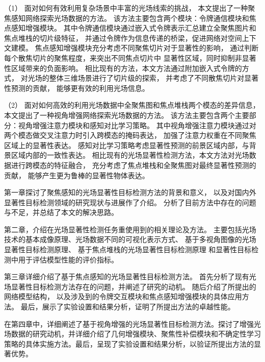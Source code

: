 %
%
（1）
%
%
面对如何有效利用复杂场景中丰富的光场线索的挑战，
本文提出了一种聚焦感知网络探索光场数据的方法。
%
%
该方法主要包含两个模块：令牌通信模块和焦点感知增强模块。
%
%
其中令牌通信模块通过嵌入式令牌表示汇总建立全聚焦图片和焦点堆栈的切片级特征，
并通过令牌作为信息传递的桥梁，促进网络对空间上下文建模。
%
%
焦点感知增强模块充分考虑不同聚焦切片对于显著性的影响，
通过判断每个散焦切片的聚焦程度，来突出不同焦点切片中
显著性区域，同时抑制非显著性区域带来的负面影响。
%
%
相比现有的方法，本文方法通过附加嵌入式令牌的方式，
对光场的整体三维场景进行了切片级的探索，
并考虑了不同散焦切片对显著性预测的贡献，
能够更有效的利用光场信息。







%
%
（2）
%
%
面对如何高效的利用光场数据中全聚焦图和焦点堆栈两个模态的差异信息，
本文提出了一种视角增强网络探索光场数据的方法。
%
%
该方法主要包含两个主要部分：视角增强注意力模块和感知对比学习策略。
%
%
其中视角增强注意力模块通过对两个模态做交叉注意力时引入跨模态的掩码表达，
加强了注意力权重在不同聚焦区域上的显著性表达。
%
%
感知对比学习策略考虑显著性预测的前景区域内部，与背景区域内部的一致性表达。
%
%
相比现有的光场显著性检测方法，本文方法对光场数据进行跨模态的特征融合，
充分考虑了焦点堆栈和全聚焦图对最终显著性预测的贡献，
能够产生更为鲁棒的显著性物体表达。





第一章探讨了聚焦感知的光场显著性目标检测方法的背景和意义，
以及对国内外显著性目标检测领域的研究现状与进展作了介绍。
分析了目前方法中存在的问题与不足，并总结了本文的解决思路。


第二章，介绍在光场显著性检测任务重使用到的相关理论及方法。
主要包括光场技术的基本成像原理、光场数据不同的可视化表示方式、
基于多视角图像的光场显著性目标检测原理、
基于焦点堆栈的光场显著性目标检测原理
和显著性目标检测中用于评估模型性能的评价指标。


第三章详细介绍了基于焦点感知的光场显著性目标检测方法。
首先分析了现有光场显著性目标检测方法存在的问题，并阐述了研究的动机。
随后介绍了所提出的网络模型结构，
以及涉及到的令牌交互模块和焦点感知增强模块的具体应用方法。
最后，展示了实验设置和结果分析，证明了所提出方法的卓越性能。


在第四章中，详细阐述了基于视角增强的光场显著性目标检测方法。探讨了增强光场数据的研究动机，并详细介绍了几何增强模块、聚焦性补偿模块和不确定性学习策略的具体实施方法。最后，呈现了实验设置和结果分析，以验证所提出方法的显著优势。































